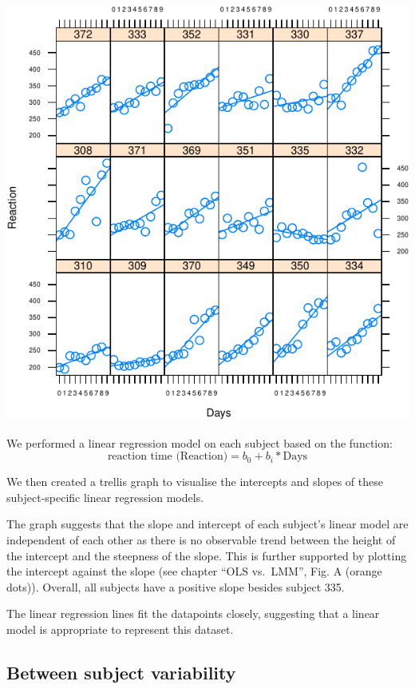 \documentclass[
]{article}
\begin{document}
\begin{center}\includegraphics{common_sleep_files/figure-latex/trellis-1} \end{center}

We performed a linear regression model on each subject based on the
function: \[\text{reaction time (Reaction)} = b_0 + b_i* \text{Days}\]

We then created a trellis graph to visualise the intercepts and slopes
of these subject-specific linear regression models.

The graph suggests that the slope and intercept of each subject's linear
model are independent of each other as there is no observable trend
between the height of the intercept and the steepness of the slope. This
is further supported by plotting the intercept against the slope (see
chapter ``OLS vs.~LMM'', Fig. A (orange dots)). Overall, all subjects
have a positive slope besides subject 335.

The linear regression lines fit the datapoints closely, suggesting that
a linear model is appropriate to represent this dataset.

\hypertarget{between-subject-variability}{%
\subsection{Between subject
variability}\label{between-subject-variability}}
\end{document}
